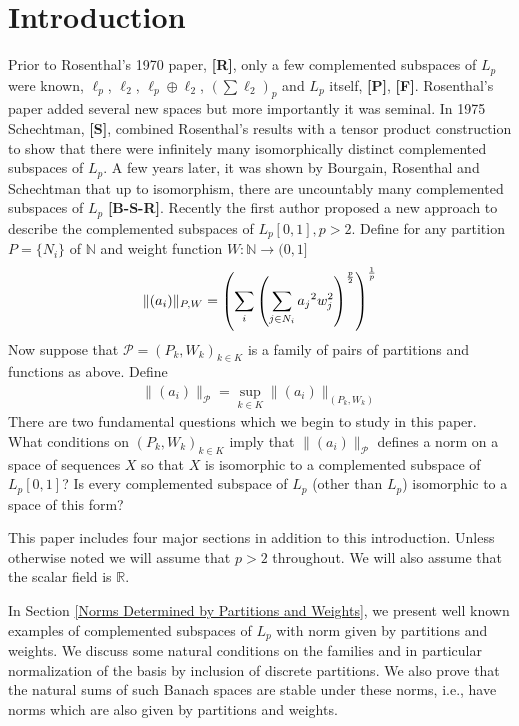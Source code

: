 \documentclass[12pt]{amsart}
\theoremstyle{definition}
\newtheorem{remark}[theorem]{Remark}
\theoremstyle{remark}
\numberwithin{equation}{section}
\begin{document}
\section{Introduction} Prior to Rosenthal's 1970 paper, {\bf [R]}, only a few
complemented subspaces of $L_p$ were known, $\ell_p$, $\ell_2$, 
$\ell_p\oplus \ell_2$, $(\sum \ell_2)_p$ and $L_p$ itself, {\bf [P]},
{\bf [F]}. Rosenthal's
paper added several new spaces but more importantly it was seminal. In
1975 Schechtman, {\bf [S]}, combined Rosenthal's results with a tensor product 
construction to show that there were infinitely many isomorphically
distinct complemented subspaces of $L_p$. A few years later, it was
shown by Bourgain, Rosenthal 
and Schechtman that up to isomorphism, there are uncountably
 many complemented subspaces of $L_p$ {\bf{[B-S-R]}}. Recently
the first author proposed a new approach to describe the
 complemented subspaces of $L_p[0,1], p>2$. Define for any partition 
$P=\{ N_i\}$ of $\mathbb{N}$ and weight function $ W : {\mathbb{N}}
 \rightarrow { ( 0, 1 ]}$
  $$\begin{displaystyle} \|(a_i)\|_{P,W} = \left(\sum_{i} \left (
 \sum_{j\in {N_i}} {a_j}^2 w_{j}^{2}\right)^{\frac{p}{2}}\right)
^{\frac{1}{p}} \end{displaystyle}$$
Now suppose that ${\mathcal{P}}=(P_k, W_k)_{k\in K}$ is a family of pairs of
partitions and functions as above.
Define \begin{eqnarray}
 \|(a_i)\|_{\mathcal{P}} =  \sup_{k\in K}
 \|(a_i)\|_{(P_k, W_k)} 
\end{eqnarray}\label{norm-0}
There are two fundamental questions 
which we begin to study in this paper. What conditions on 
$(P_k, W_k)_{k \in K}$ imply that $\|(a_i)\|_{\mathcal{P}}$  
 defines a norm on a 
 space of sequences $X$ so that $X$ is isomorphic to a complemented
 subspace of $L_p[0, 1]$? Is every complemented subspace of $L_p$ 
(other than $L_p$) isomorphic to a space of this form?


This paper includes four major sections in addition to this introduction.
Unless otherwise noted we will assume that $p>2$ throughout. We will
also assume that the scalar field is $\mathbb{R}$.

In Section \ref{Norms Determined by Partitions and Weights},
we present well known examples of complemented subspaces 
of $L_p$ with norm given by partitions and weights.
We discuss some natural conditions on the families and in particular
normalization of the basis by inclusion of discrete 
partitions.
We also prove that
the natural sums of such Banach spaces are stable under these norms, i.e.,
have norms which are also given by partitions and weights.
\end{document}
